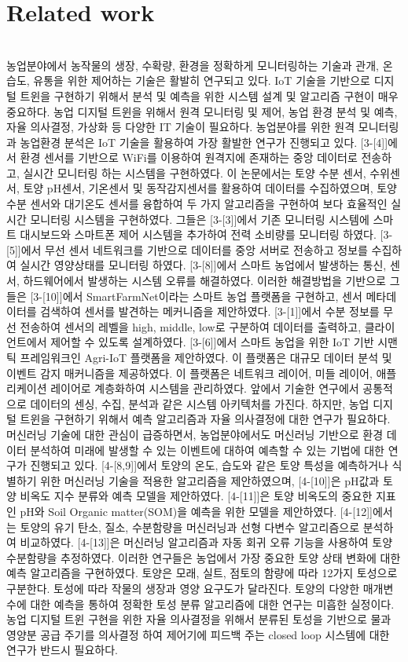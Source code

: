 \documentclass[11pt]{article}
\begin{document}
\section{Related work}
\indent \\농업분야에서 농작물의 생장, 수확량, 환경을 정확하게 모니터링하는 기술과 관개, 온습도, 유통을 위한 제어하는 기술은 활발히 연구되고 있다. IoT 기술을 기반으로 디지털 트윈을 구현하기 위해서 분석 및 예측을 위한 시스템 설계 및 알고리즘 구현이 매우 중요하다. 농업 디지털 트윈을 위해서 원격 모니터링 및 제어, 농업 환경 분석 및 예측, 자율 의사결정, 가상화 등 다양한 IT 기술이 필요하다. 농업분야를 위한 원격 모니터링 과 농업환경 분석은 IoT 기술을 활용하여 가장 활발한 연구가 진행되고 있다. [3-[4]]에서 환경 센서를 기반으로 WiFi를 이용하여 원격지에 존재하는 중앙 데이터로 전송하고, 실시간 모니터링 하는 시스템을 구현하였다. 이 논문에서는 토양 수분 센서, 수위센서, 토양 pH센서, 기온센서 및 동작감지센서를 활용하여 데이터를 수집하였으며, 토양 수분 센서와 대기온도 센서를 융합하여 두 가지 알고리즘을 구현하여 보다 효율적인 실시간 모니터링 시스템을 구현하였다. 그들은 [3-[3]]에서 기존 모니터링 시스템에 스마트 대시보드와 스마트폰 제어 시스템을 추가하여 전력 소비량를 모니터링 하였다. [3-[5]]에서 무선 센서 네트워크를 기반으로 데이터를 중앙 서버로 전송하고 정보를 수집하여 실시간 영양상태를 모니터링 하였다. [3-[8]]에서 스마트 농업에서 발생하는 통신, 센서, 하드웨어에서 발생하는 시스템 오류를 해결하였다. 이러한 해결방법을 기반으로 그들은 [3-[10]]에서 SmartFarmNet이라는 스마트 농업 플랫폼을 구현하고, 센서 메타데이터를 검색하여 센서를 발견하는 메커니즘을 제안하였다. [3-[1]]에서 수분 정보를 무선 전송하여 센서의 레벨을 high, middle, low로 구분하여 데이터를 출력하고, 클라이언트에서 제어할 수 있도록 설계하였다. [3-[6]]에서 스마트 농업을 위한 IoT 기반 시맨틱 프레임워크인 Agri-IoT 플랫폼을 제안하였다. 이 플랫폼은 대규모 데이터 분석 및 이벤트 감지 매커니즘을 제공하였다. 이 플랫폼은 네트워크 레이어, 미들 레이어, 애플리케이션 레이어로 계층화하여 시스템을 관리하였다. 앞에서 기술한 연구에서 공통적으로 데이터의 센싱, 수집, 분석과 같은 시스템 아키텍처를 가진다. 하지만, 농업 디지털 트윈을 구현하기 위해서 예측 알고리즘과 자율 의사결정에 대한 연구가 필요하다. 머신러닝 기술에 대한 관심이 급증하면서, 농업분야에서도 머신러닝 기반으로 환경 데이터 분석하여 미래에 발생할 수 있는 이벤트에 대하여 예측할 수 있는 기법에 대한 연구가 진행되고 있다. [4-[8,9]]에서 토양의 온도, 습도와 같은 토양 특성을 예측하거나 식별하기 위한 머신러닝 기술을 적용한 알고리즘을 제안하였으며, [4-[10]]은 pH값과 토양 비옥도 지수 분류와 예측 모델을 제안하였다. [4-[11]]은 토양 비옥도의 중요한 지표인 pH와 Soil Organic matter(SOM)을 예측을 위한 모델을 제안하였다. [4-[12]]에서는 토양의 유기 탄소, 질소, 수분함량을 머신러닝과 선형 다변수 알고리즘으로 분석하여 비교하였다. [4-[13]]은 머신러닝 알고리즘과 자동 회귀 오류 기능을 사용하여 토양 수분함량을 추정하였다. 이러한 연구들은 농업에서 가장 중요한 토양 상태 변화에 대한 예측 알고리즘을 구현하였다. 토양은 모래, 실트, 점토의 함량에 따라 12가지 토성으로 구분한다. 토성에 따라 작물의 생장과 영양 요구도가 달라진다. 토양의 다양한 매개변수에 대한 예측을 통하여 정확한 토성 분류 알고리즘에 대한 연구는 미흡한 실정이다. 농업 디지털 트윈 구현을 위한 자율 의사결정을 위해서 분류된 토성을 기반으로 물과 영양분 공급 주기를 의사결정 하여 제어기에 피드백 주는 closed loop 시스템에 대한 연구가 반드시 필요하다.
\end{document}
